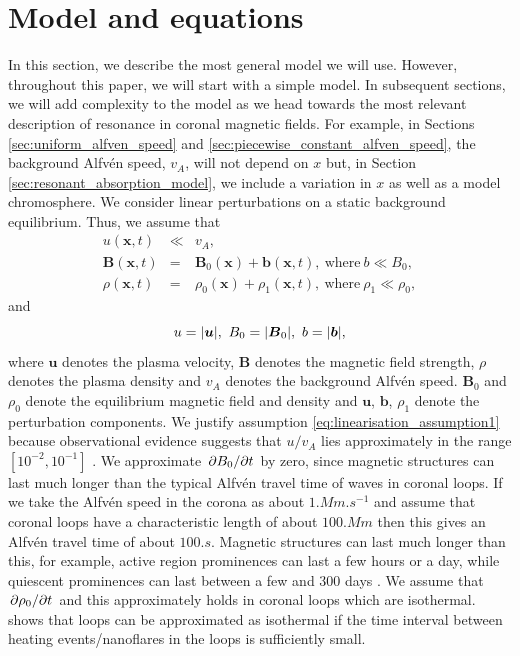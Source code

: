 \documentclass[linenumbers]{aastex63}
\let\vec\boldsymbol
\begin{document}
\section{Model and equations}
\label{sec:model_and_equations}

In this section, we describe the most general model we will use. However, throughout this paper, we will start with a simple model. In subsequent sections, we will add complexity to the model as we head
towards the most relevant description of resonance in coronal magnetic fields. For example, in Sections \ref{sec:uniform_alfven_speed} and \ref{sec:piecewise_constant_alfven_speed}, the background Alfv\'en speed, $v_A$, will not depend on $x$ but, in Section \ref{sec:resonant_absorption_model}, we include a variation in $x$ as well as a model chromosphere. We consider linear perturbations on a static background equilibrium. Thus, we assume that
\begin{eqnarray}
    \label{eq:linearisation_assumption1}
    u(\vec{x},t) & \ll & v_A, \\
    \label{eq:linearisation_assumption2}
    \vec{B}(\vec{x},t) & = & \vec{B}_0(\vec{x}) + \vec{b}(\vec{x},t),\ \text{where}\ b \ll B_0, \\
    \label{eq:linearisation_assumption3}
    \rho(\vec{x},t) & = & \rho_0(\vec{x}) + \rho_1(\vec{x},t),\ \text{where}\ \rho_1 \ll \rho_0,
\end{eqnarray}
and 
\begin{equation}
    u = \abs{\vec{u}},\ B_0=\abs{\vec{B}_0},\ b=\abs{\vec{b}},
\end{equation}
where $\vec{u}$ denotes the plasma velocity, $\vec{B}$ denotes the magnetic field strength, $\rho$ denotes the plasma density and $v_A$ denotes the background Alfv\'en speed. $\vec{B}_0$ and $\rho_0$ denote the equilibrium magnetic field and density and $\vec{u}$, $\vec{b}$, $\rho_1$ denote the perturbation components. We justify assumption \eqref{eq:linearisation_assumption1} because observational evidence suggests that $u / v_A$ lies approximately in the range $[10^{-2},10^{-1}]$ \citep{McIntosh2011,McIntosh2012}. We approximate $\pdv*{B_0}{t}$ by zero, since magnetic structures can last much longer than the typical Alfvén travel time of waves in coronal loops. If we take the Alfvén speed in the corona as about $1\si{.Mm.s^{-1}}$ and assume that coronal loops have a characteristic length of about $100\si{.Mm}$ then this gives an Alfvén travel time of about $100\si{.s}$. 
Magnetic structures can last much longer than this, for example, active region prominences can last a few hours or a day, while quiescent prominences can last between a few and 300 days \citep{Priest2014}. We assume that $\pdv*{\rho_0}{t}$ and this approximately holds in coronal loops which are isothermal. \citet{Klimchuk2015} shows that loops can be approximated as isothermal if the time interval between heating events/nanoflares in the loops is sufficiently small.
\end{document}
